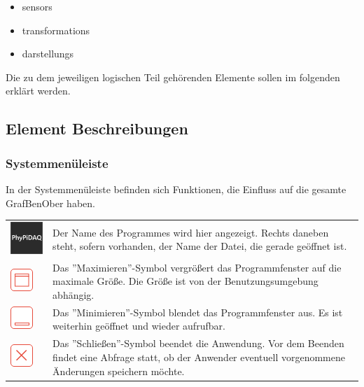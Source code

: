 \documentclass[parskip=full]{scrartcl}
\begin{document}
\begin{itemize}
	\item \glspl{sensor}
	\item \glspl{transformation}
	\item \glspl{darstellung}
\end{itemize}

Die zu dem jeweiligen logischen Teil gehörenden Elemente sollen im folgenden erklärt werden.

\subsection{Element Beschreibungen}

\subsubsection{Systemmenüleiste}

In der Systemmenüleiste befinden sich Funktionen, die Einfluss auf die gesamte \gls{GrafBenOber} haben.

\begin{tabular}[t]{p{1cm} p{10cm}} %
	\vspace{0cm}\includegraphics[width = 1 cm]{Grafik/PhyPiDAQ.png} & Der Name des Programmes wird hier angezeigt. Rechts daneben steht, sofern vorhanden, der Name der Datei, die gerade geöffnet ist.\newline\\
	\vspace{0cm}\includegraphics[width = 1 cm]{Grafik/Maximieren.png} & Das ''Maximieren''-Symbol vergrößert das Programmfenster auf die maximale Größe. Die Größe ist von der Benutzungsumgebung abhängig.\newline\\
	\vspace{0cm}\includegraphics[width = 1 cm]{Grafik/Minimieren.png} & Das ''Minimieren''-Symbol blendet das Programmfenster aus. Es ist weiterhin geöffnet und wieder aufrufbar. \\
	\vspace{0cm}\includegraphics[width = 1 cm]{Grafik/Schliessen.png} & Das ''Schließen''-Symbol beendet die Anwendung. Vor dem Beenden findet eine Abfrage statt, ob der Anwender eventuell vorgenommene Änderungen speichern möchte.\\
\end{tabular}
\end{document}
